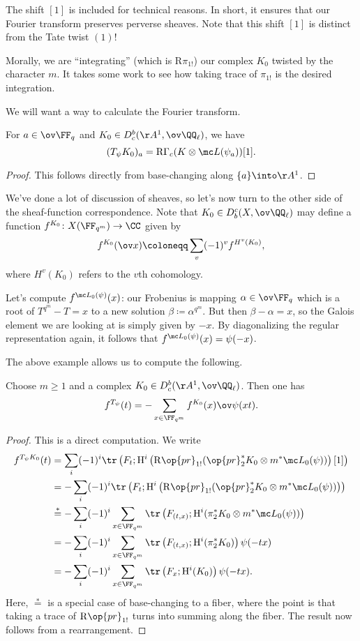 \documentclass[../notes.tex]{subfiles}
\begin{document}
\begin{remark}
	The shift $[1]$ is included for technical reasons. In short, it ensures that our Fourier transform preserves perverse sheaves. Note that this shift $[1]$ is distinct from the Tate twist $(1)$!
\end{remark}
Morally, we are ``integrating'' (which is $\mathrm R\pi_{1!}$) our complex $K_0$ twisted by the character $m$. It takes some work to see how taking trace of $\pi_{1!}$ is the desired integration.

We will want a way to calculate the Fourier transform.
\begin{theorem}
	For $a\in\ov\FF_q$ and $K_0\in D^b_c(\AA^1,\ov\QQ_\ell)$, we have
	\[(T_\psi K_0)_a=\mathrm R\Gamma_c(K\otimes\mc L(\psi_a))[1].\]
\end{theorem}
\begin{proof}
	This follows directly from base-changing along $\{a\}\into\AA^1$.
\end{proof}
We've done a lot of discussion of sheaves, so let's now turn to the other side of the sheaf-function correspondence. Note that $K_0\in D_b^c(X,\ov\QQ_\ell)$ may define a function $f^{K_0}\colon X(\FF_{q^m})\to\CC$ given by
\[f^{K_0}(\ov x)\coloneqq\sum_{v}(-1)^vf^{H^v(K_0)},\]
where $H^v(K_0)$ refers to the $v$th cohomology.
\begin{example}
	Let's compute $f^{\mc L_0(\psi)}(x)$: our Frobenius is mapping $\alpha\in\ov\FF_q$ which is a root of $T^{q^m}-T=x$ to a new solution $\beta\coloneqq\alpha^{q^m}$. But then $\beta-\alpha=x$, so the Galois element we are looking at is simply given by $-x$. By diagonalizing the regular representation again, it follows that $f^{\mc L_0(\psi)}(x)=\psi(-x)$.
\end{example}
The above example allows us to compute the following.
\begin{lemma}
	Choose $m\ge1$ and a complex $K_0\in D^b_c(\AA^1,\ov\QQ_\ell)$. Then one has
	\[f^{T_\psi}(t)=-\sum_{x\in\FF_{q^m}}f^{K_0}(x)\ov\psi(xt).\]
\end{lemma}
\begin{proof}
	This is a direct computation. We write
	\begin{align*}
		f^{T_\psi K_0}(t) &= \sum_i(-1)^i\tr\left(F_t;\mathrm H^i\left(\mathrm R\op{pr}_{1!}(\op{pr}_2^*K_0\otimes m^*\mc L_0(\psi))\right)[1]\right) \\
		&= -\sum_i(-1)^i\tr\left(F_t;\mathrm H^i\left(\mathrm R\op{pr}_{1!}(\op{pr}_2^*K_0\otimes m^*\mc L_0(\psi))\right)\right) \\
		&\stackrel*= -\sum_i(-1)^i\sum_{x\in\FF_{q^m}}\tr\left(F_{(t,x)};\mathrm H^i(\pi_2^*K_0\otimes m^*\mc L_0(\psi))\right) \\
		&= -\sum_i(-1)^i\sum_{x\in\FF_{q^m}}\tr\left(F_{(t,x)};\mathrm H^i(\pi_2^*K_0)\right)\psi(-tx) \\
		&= -\sum_i(-1)^i\sum_{x\in\FF_{q^m}}\tr\left(F_{x};\mathrm H^i(K_0)\right)\psi(-tx).
	\end{align*}
	Here, $\stackrel*=$ is a special case of base-changing to a fiber, where the point is that taking a trace of $\mathrm R\op{pr}_{1!}$ turns into summing along the fiber. The result now follows from a rearrangement.
\end{proof}
\end{document}
